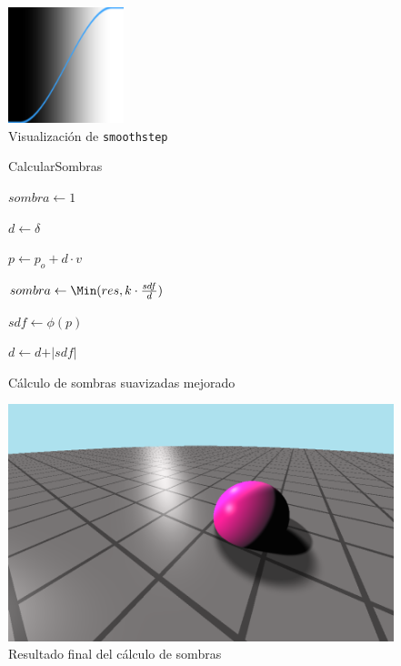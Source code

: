 \begin{figure}[ht!]
    \centering
    \includegraphics[width=0.3\textwidth]{Plantilla-TFG-master/img/smoothstep.png}
    \caption{Visualización de \texttt{smoothstep} \cite{smoothstep}}
\end{figure}

\begin{figure}[ht!]
    \centering
   \begin{algorithm}[H]
        \caption{CalcularSombras}
            $sombra \gets 1$
            
            $d \gets \delta$ 
            
             {
                $p \gets p_o + d \cdot v$
                
                $sombra \gets \Min(res, k\cdot \frac{sdf}{d})$
                
                $sdf \gets \phi(p)$

                $d \gets d + \vert sdf\vert$
                
            }

    \end{algorithm}

    \caption{Cálculo de sombras suavizadas mejorado}
    \label{fig:sombras3}
\end{figure}

\begin{figure}[ht!]
    \centering
    \includegraphics[width=\textwidth]{Plantilla-TFG-master/img/shadowSoft.png}
    \caption{Resultado final del cálculo de sombras}
    \label{fig:sombras4}
\end{figure}


